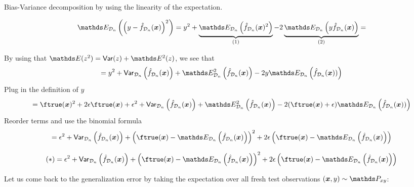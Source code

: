 \begin{vbframe} {Bias-Variance decomposition}
by using the linearity of the expectation.  %

\framebreak
\begin{footnotesize}
$$
\E_{\D_n}\left(\left(y - \fh_{\D_n}(\xv)\right)^2\right) = 
y^2 + \underbrace{\E_{\D_n}\left(\fh_{\D_n}(\xv)^2\right)}_{(1)}  - 2\underbrace{\E_{\D_n}\left(y\fh_{\D_n}(\xv)\right)}_{(2)} =
$$
\end{footnotesize}


\begin{footnotesize}
By using that $\E(z^2) =\var(z) + \E^2(z)$, we see that
$$
= y^2 + \var_{\D_n}\left(\fh_{\D_n}(\xv)\right) + \E^2_{\D_n}\left(\fh_{\D_n}(\xv)\right) - 2y \E_{\D_n}\left(\fh_{\D_n}(\xv))\right) 
$$
Plug in the definition of $y$
$$
 = \ftrue(\xv)^2 +2\epsilon\ftrue(\xv) + \epsilon^2 + \var_{\D_n}\left(\fh_{\D_n}(\xv)\right) + \E^2_{\D_n}\left(\fh_{\D_n}(\xv)\right) - 2 (\ftrue(\xv)+\epsilon)\E_{\D_n}\left(\fh_{\D_n}(\xv))\right) 
$$
Reorder terms and use the binomial formula
$$
= \epsilon^2 + \var_{\D_n}\left(\fh_{\D_n}(\xv)\right) + 
  \left(\ftrue(\xv) - \E_{\D_n}\left(\fh_{\D_n}(\xv)\right)\right)^2
 +2 \epsilon \left(\ftrue(\xv) - \E_{\D_n}\left(\fh_{\D_n}(\xv)\right)\right)
$$
\end{footnotesize}


\framebreak 

\begin{footnotesize}
$$
(*) = \epsilon^2 + \var_{\D_n}\left(\fh_{\D_n}(\xv)\right) + 
  \left(\ftrue(\xv) - \E_{\D_n}\left(\fh_{\D_n}(\xv)\right)\right)^2
 +2 \epsilon \left(\ftrue(\xv) - \E_{\D_n}\left(\fh_{\D_n}(\xv)\right)\right)
$$
\end{footnotesize}

Let us come back to the generalization error by taking the expectation over all fresh test observations $(\xv, y) \sim \Pxy$: 


\end{vbframe}
